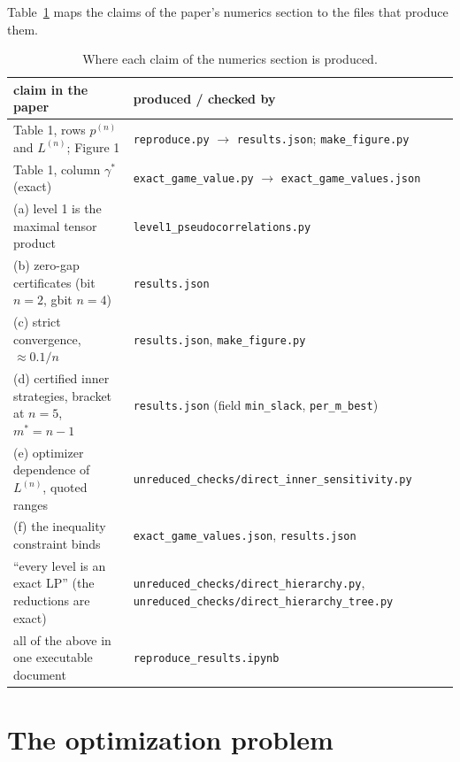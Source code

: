 \documentclass[11pt,a4paper]{article}
\newcommand*{\code}[1]{\texttt{#1}}
\theoremstyle{remark}
\begin{document}
Table~\ref{tab:map} maps the claims of the paper's numerics section to the
files that produce them.

\begin{table}[ht]\centering\small
\begin{tabular}{>{\raggedright\arraybackslash}p{56mm}>{\raggedright\arraybackslash}p{84mm}}
\toprule
claim in the paper & produced / checked by\\
\midrule
Table 1, rows $p^{(n)}$ and $L^{(n)}$; Figure 1 & \code{reproduce.py} $\to$ \code{results.json}; \code{make\_figure.py}\\
Table 1, column $\gamma^*$ (exact) & \code{exact\_game\_value.py} $\to$ \code{exact\_game\_values.json}\\
(a) level 1 is the maximal tensor product & \code{level1\_pseudocorrelations.py}\\
(b) zero-gap certificates (bit $n=2$, gbit $n=4$) & \code{results.json}\\
(c) strict convergence, $\approx 0.1/n$ & \code{results.json}, \code{make\_figure.py}\\
(d) certified inner strategies, bracket at $n=5$, $m^*=n-1$ & \code{results.json} (field \code{min\_slack}, \code{per\_m\_best})\\
(e) optimizer dependence of $L^{(n)}$, quoted ranges & \code{unreduced\_checks/direct\_inner\_sensitivity.py}\\
(f) the inequality constraint binds & \code{exact\_game\_values.json}, \code{results.json}\\
``every level is an exact LP'' (the reductions are exact) & \code{unreduced\_checks/direct\_hierarchy.py}, \code{unreduced\_checks/direct\_hierarchy\_tree.py}\\
all of the above in one executable document & \code{reproduce\_results.ipynb}\\
\bottomrule
\end{tabular}
\caption{Where each claim of the numerics section is produced.}\label{tab:map}
\end{table}

\section{The optimization problem}\label{sec:problem}
\end{document}
